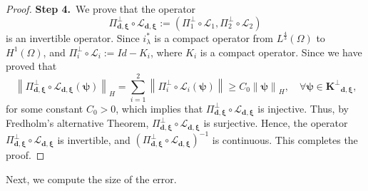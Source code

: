 \documentclass[a4paper,reqno,11pt,oneside]{amsart}
\numberwithin{equation}{section}
\begin{document}
\begin{proof}
\medskip
\textbf{Step 4.}~We prove that the operator $$\Pi^{\perp}_{\bm{d},\bm{\xi}}\circ\bm{\mathcal{L}}_{\bm{d},\bm{\xi}}:= \left(\Pi_1^{\perp}\circ\mathcal{L}_1,\Pi_2^{\perp}\circ\mathcal{L}_2\right)$$ is an invertible operator. Since $i_\lambda^*$ is a compact operator from $L^{\frac{4}{3}}(\Omega)$ to $H^1(\Omega)$, and $\Pi_i^{\perp}\circ\mathcal{L}_i:=Id-K_i$, where $K_i$ is a compact operator. Since we have proved that 
$$\left\|\Pi^{\perp}_{\bm{d},\bm{\xi}}\circ\bm{\mathcal{L}}_{\bm{d},\bm{\xi}}(\bm{\psi})\right\|_{H}=\sum_{i=1}^2\left\|\Pi_i^{\perp}\circ\mathcal{L}_i(\bm{\psi})\right\|\geq C_0\left\|\bm{\psi}\right\|_{H}, \quad\text{$\forall \bm{\psi}\in \bm{K^{\perp}}_{\bm{d},\bm{\xi}}$,}$$
 for some constant $C_0>0$, which implies that $\Pi^{\perp}_{\bm{d},\bm{\xi}}\circ\bm{\mathcal{L}}_{\bm{d},\bm{\xi}}$ is injective. Thus, by Fredholm's alternative Theorem, $\Pi^{\perp}_{\bm{d},\bm{\xi}}\circ\bm{\mathcal{L}}_{\bm{d},\bm{\xi}}$ is surjective. Hence, the operator $\Pi^{\perp}_{\bm{d},\bm{\xi}}\circ\bm{\mathcal{L}}_{\bm{d},\bm{\xi}}$ is invertible, and $\left(\Pi^{\perp}_{\bm{d},\bm{\xi}}\circ\bm{\mathcal{L}}_{\bm{d},\bm{\xi}}\right)^{-1}$ is continuous. This completes the proof.
 
    \end{proof}
    
    Next, we compute the size of the error.
    
\end{document}
